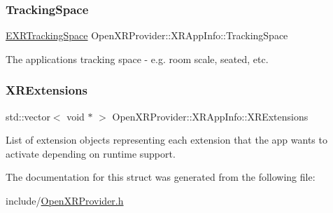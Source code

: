 \subsubsection{\texorpdfstring{TrackingSpace}{TrackingSpace}}
{\footnotesize\ttfamily \mbox{\hyperlink{namespace_open_x_r_provider_a005dd91723b05b123b8fccbc41798b05}{E\+X\+R\+Tracking\+Space}} Open\+X\+R\+Provider\+::\+X\+R\+App\+Info\+::\+Tracking\+Space}



The application\textquotesingle{}s tracking space -\/ e.\+g. room scale, seated, etc. 

\mbox{\label{struct_open_x_r_provider_1_1_x_r_app_info_a8b51fa00d11c4b3711440bf4b20b57fe}} 
\subsubsection{\texorpdfstring{XRExtensions}{XRExtensions}}
{\footnotesize\ttfamily std\+::vector$<$ void $\ast$ $>$ Open\+X\+R\+Provider\+::\+X\+R\+App\+Info\+::\+X\+R\+Extensions}



List of extension objects representing each extension that the app wants to activate depending on runtime support. 



The documentation for this struct was generated from the following file\+:\begin{DoxyCompactItemize}
\item 
include/\mbox{\hyperlink{_open_x_r_provider_8h}{Open\+X\+R\+Provider.\+h}}\end{DoxyCompactItemize}
